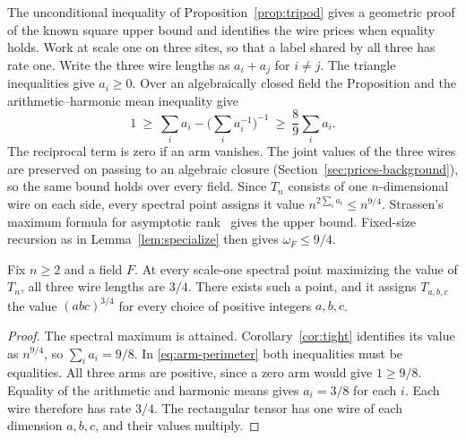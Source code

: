 The unconditional inequality of Proposition~\ref{prop:tripod} gives a
geometric proof of the known square upper bound and identifies the wire
prices when equality holds. Work at scale one on three sites, so that a
label shared by all three has rate one. Write the three wire lengths as
\(a_i+a_j\) for \(i\ne j\). The triangle inequalities give \(a_i\ge0\).
Over an algebraically closed field the Proposition and the
arithmetic--harmonic mean inequality give
\begin{equation}\label{eq:arm-perimeter}
  1\ \ge\ \sum_i a_i-\Big(\sum_i a_i^{-1}\Big)^{-1}
     \ \ge\ \frac89\sum_i a_i .
\end{equation}
The reciprocal term is zero if an arm vanishes.
The joint values of the three wires are preserved on passing to an
algebraic closure (Section~\ref{sec:prices-background}), so the same
bound holds over every field. Since \(T_n\) consists of one
\(n\)-dimensional wire on each side, every spectral point assigns it
value \(n^{2\sum_i a_i}\le n^{9/4}\). Strassen's maximum formula for
asymptotic rank~\cite{spectrum} gives the upper bound. Fixed-size
recursion as in Lemma~\ref{lem:specialize} then gives \(\omega_F\le9/4\).

\begin{corollary}\label{cor:extremal-price}
Fix \(n\ge2\) and a field \(F\). At every scale-one spectral point
maximizing the value of \(T_n\), all three wire lengths are \(3/4\).
There exists such a point, and it assigns \(T_{a,b,c}\) the value
\((abc)^{3/4}\) for every choice of positive integers \(a,b,c\).
\end{corollary}

\begin{proof}
The spectral maximum is attained. Corollary~\ref{cor:tight} identifies
its value as \(n^{9/4}\), so \(\sum_i a_i=9/8\). In
\eqref{eq:arm-perimeter} both inequalities must be equalities. All three
arms are positive, since a zero arm would give \(1\ge9/8\).
Equality of the arithmetic and harmonic means gives \(a_i=3/8\) for
each \(i\). Each wire therefore has rate \(3/4\). The rectangular tensor
has one wire of each dimension \(a,b,c\), and their values multiply.
\end{proof}
